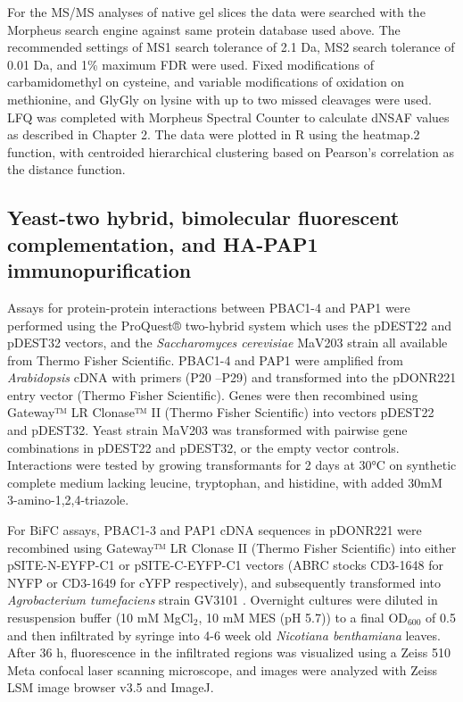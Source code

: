 For the MS/MS analyses of native gel slices the data were searched with the Morpheus search engine \citep{wenger13} against same protein database used above. The recommended settings of MS1 search tolerance of 2.1 Da, MS2 search tolerance of 0.01 Da, and 1\% maximum FDR were used.  Fixed modifications of carbamidomethyl on cysteine, and variable modifications of oxidation on methionine, and GlyGly on lysine with up to two missed cleavages were used. LFQ was completed with Morpheus Spectral Counter \citep{gemperline16} to calculate dNSAF values as described in Chapter 2. The data were plotted in R using the heatmap.2 function, with centroided hierarchical clustering based on Pearson’s correlation as the distance function.
\subsection{Yeast-two hybrid, bimolecular fluorescent complementation, and HA-PAP1 immunopurification}
	Assays for protein-protein interactions between PBAC1-4 and PAP1 were performed using the ProQuest® two-hybrid system which uses the pDEST22 and pDEST32 vectors, and the \textit{Saccharomyces cerevisiae} MaV203 strain \citep{vidal96} all available from Thermo Fisher Scientific. PBAC1-4 and PAP1 were amplified from \textit{Arabidopsis} cDNA with primers (P20 –P29) and transformed into the pDONR221 entry vector (Thermo Fisher Scientific). Genes were then recombined using Gateway™ LR Clonase™ II (Thermo Fisher Scientific) into vectors pDEST22 and pDEST32. Yeast strain MaV203 was transformed with pairwise gene combinations in pDEST22 and pDEST32, or the empty vector controls. Interactions were tested by growing transformants for 2 days at 30°C on synthetic complete medium lacking leucine, tryptophan, and histidine, with added 30mM 3-amino-1,2,4-triazole.
	
	For BiFC assays, PBAC1-3 and PAP1 cDNA sequences in pDONR221 were recombined using Gateway™  LR Clonase II (Thermo Fisher Scientific) into either pSITE-N-EYFP-C1 or pSITE-C-EYFP-C1 vectors \citep{martin09} (ABRC stocks CD3-1648 for NYFP or CD3-1649 for cYFP respectively), and subsequently transformed into \textit{Agrobacterium tumefaciens} strain GV3101 \citep{gelvin03}. Overnight cultures were diluted in resuspension buffer (10 mM MgCl$_{2}$, 10 mM MES (pH 5.7)) to a final OD$_{600}$ of 0.5 and then infiltrated by syringe into 4-6 week old \textit{Nicotiana benthamiana} leaves. After 36 h, fluorescence in the infiltrated regions was visualized using a Zeiss 510 Meta confocal laser scanning microscope, and images were analyzed with Zeiss LSM image browser v3.5 and ImageJ.
	
